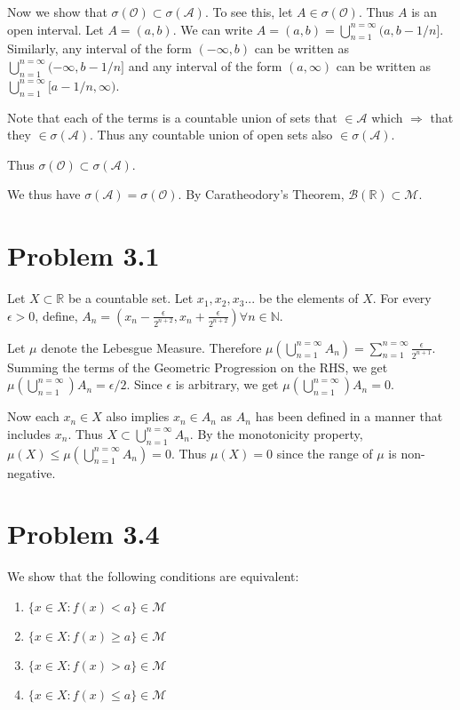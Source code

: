 \documentclass[letterpaper,12pt]{article}
\theoremstyle{definition}
\begin{document}
    Now we show that $\sigma(\mathcal O) \subset \sigma(\mathcal A)$. To see this, let $A \in \sigma(\mathcal O)$. Thus $A$ is an open interval. Let $A = (a,b)$. We can write $A = (a,b) = \bigcup_{n=1}^{n=\infty}(a, b-1/n]$. Similarly,  any interval of the form $(-\infty, b)$ can be written as $\bigcup_{n=1}^{n=\infty}(-\infty, b-1/n]$ and any interval of the form $(a, \infty)$ can be written as $\bigcup_{n=1}^{n=\infty}[a-1/n, \infty)$.
\newline

    Note that each of the terms is a countable union of sets that $\in \mathcal A$ which $\Rightarrow$ that they $\in \sigma(\mathcal A)$. Thus any countable union of open sets also $\in \sigma(\mathcal A)$.
\newline

Thus $\sigma(\mathcal O) \subset \sigma(\mathcal A)$.
\newline

 We thus have $\sigma(\mathcal A) = \sigma(\mathcal O)$. By Caratheodory's Theorem, $\mathcal B(\mathbb R) \subset \mathcal M$.
\newpage
  \section*{Problem 3.1}
    Let $X \subset \mathbb R$ be a countable set. Let $x_1, x_2, x_3 ...$ be the elements of $X$. For every $\epsilon > 0$, define, $A_n = (x_n - \frac{\epsilon}{2^{n+2}}, x_n + \frac{\epsilon}{2^{n+2}}) \forall n \in \mathbb N$.

    Let $\mu$ denote the Lebesgue Measure. Therefore $\mu(\bigcup_{n=1}^{n=\infty}A_n) = \sum_{n=1}^{n=\infty}\frac{\epsilon}{2^{n+1}}$. Summing the terms of the Geometric Progression on the RHS, we get
    $\mu(\bigcup_{n=1}^{n=\infty})A_n = \epsilon /2$. Since $\epsilon$ is arbitrary, we get $\mu(\bigcup_{n=1}^{n=\infty})A_n = 0$.

 Now each $x_n \in X$ also implies $x_n \in A_n$ as $A_n$ has been defined in a manner that includes $x_n$.
 Thus $X \subset \bigcup_{n=1}^{n=\infty}A_n$. By the monotonicity property, $\mu(X) \le \mu(\bigcup_{n=1}^{n=\infty}A_n) = 0$. Thus $\mu(X) = 0$ since the range of $\mu$ is non-negative.

  \section*{Problem 3.4}
  We show that the following conditions are equivalent:
    \begin{enumerate}
      \item $\{x \in X : f(x) < a \} \in \mathcal{M}$
      \item $\{x \in X : f(x) \geq a \} \in \mathcal{M}$
      \item $\{x \in X : f(x) > a \} \in \mathcal{M}$
      \item $\{x \in X : f(x) \leq a \} \in \mathcal{M}$
    \end{enumerate}
\end{document}
